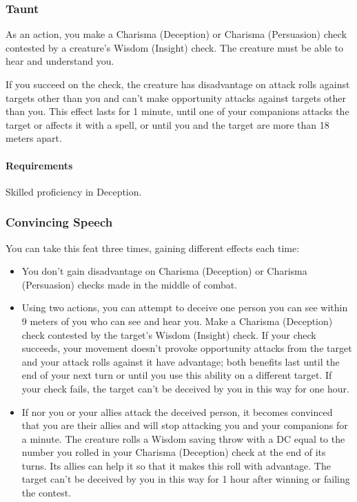 \subsubsection{Taunt} \label{feat::taunt}
    As an action, you make a Charisma (Deception) or Charisma (Persuasion) check contested by a creature's Wisdom (Insight) check.
    The creature must be able to hear and understand you.

    If you succeed on the check, the creature has disadvantage on attack rolls against targets other than you and can't make opportunity attacks against targets other than you.
    This effect lasts for 1 minute, until one of your companions attacks the target or affects it with a spell, or until you and the target are more than 18 meters apart.
    \paragraph{Requirements} Skilled proficiency in Deception.
\subsubsection{Convincing Speech} \label{feat::convincingspeech}
    You can take this feat three times, gaining different effects each time:
    \begin{itemize}
        \item You don't gain disadvantage on Charisma (Deception) or Charisma (Persuasion) checks made in the middle of combat.
        \item Using two actions, you can attempt to deceive one person you can see within 9 meters of you who can see and hear you.
        Make a Charisma (Deception) check contested by the target's Wisdom (Insight) check.
        If your check succeeds, your movement doesn't provoke opportunity attacks from the target and your attack rolls against it have advantage; both benefits last until the end of your next turn or until you use this ability on a different target.
        If your check fails, the target can't be deceived by you in this way for one hour.
        \item If nor you or your allies attack the deceived person, it becomes convinced that you are their allies and will stop attacking you and your companions for a minute.
        The creature rolls a Wisdom saving throw with a DC equal to the number you rolled in your Charisma (Deception) check at the end of its turns.
        Its allies can help it so that it makes this roll with advantage.
        The target can't be deceived by you in this way for 1 hour after winning or failing the contest.
    \end{itemize}

